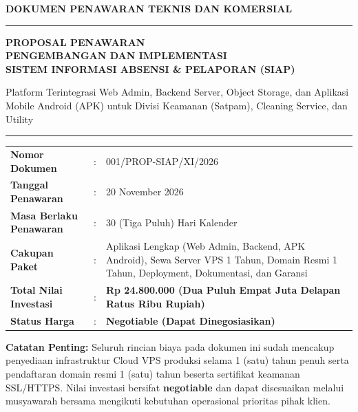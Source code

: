 \documentclass[11pt,a4paper]{article}
\begin{document}
\begin{titlepage}
    \thispagestyle{empty}
    \vspace*{0.8cm}

    {\footnotesize\bfseries\textcolor{mutedgray}{DOKUMEN PENAWARAN TEKNIS DAN KOMERSIAL}}\\[4pt]
    \rule{\textwidth}{1.5pt}

    \vspace{1.8cm}

    {\Huge\bfseries PROPOSAL PENAWARAN}\\[10pt]
    {\LARGE\bfseries PENGEMBANGAN DAN IMPLEMENTASI}\\[6pt]
    {\LARGE\bfseries SISTEM INFORMASI ABSENSI \& PELAPORAN (SIAP)}

    \vspace{0.8cm}
    {\large\textcolor{charcoal}{Platform Terintegrasi Web Admin, Backend Server, Object Storage, dan Aplikasi Mobile Android (APK) untuk Divisi Keamanan (Satpam), Cleaning Service, dan Utility}}

    \vspace{1.2cm}
    \rule{\textwidth}{0.6pt}

    \vspace{1.0cm}
    \begin{tabular}{@{}L{4.6cm}L{0.3cm}L{9.8cm}@{}}
        \textbf{Nomor Dokumen} & : & 001/PROP-SIAP/XI/2026 \\[4pt]
        \textbf{Tanggal Penawaran} & : & 20 November 2026 \\[4pt]
        \textbf{Masa Berlaku Penawaran} & : & 30 (Tiga Puluh) Hari Kalender \\[4pt]
        \textbf{Cakupan Paket} & : & Aplikasi Lengkap (Web Admin, Backend, APK Android), Sewa Server VPS 1 Tahun, Domain Resmi 1 Tahun, Deployment, Dokumentasi, dan Garansi \\[4pt]
        \textbf{Total Nilai Investasi} & : & \textbf{Rp 24.800.000 (Dua Puluh Empat Juta Delapan Ratus Ribu Rupiah)} \\[4pt]
        \textbf{Status Harga} & : & \textbf{Negotiable (Dapat Dinegosiasikan)} \\
    \end{tabular}

    \vfill

    \begin{framed}
        \small
        \textbf{Catatan Penting:} Seluruh rincian biaya pada dokumen ini sudah mencakup penyediaan infrastruktur Cloud VPS produksi selama 1 (satu) tahun penuh serta pendaftaran domain resmi 1 (satu) tahun beserta sertifikat keamanan SSL/HTTPS. Nilai investasi bersifat \textbf{negotiable} dan dapat disesuaikan melalui musyawarah bersama mengikuti kebutuhan operasional prioritas pihak klien.
    \end{framed}


\end{titlepage}
\end{document}
